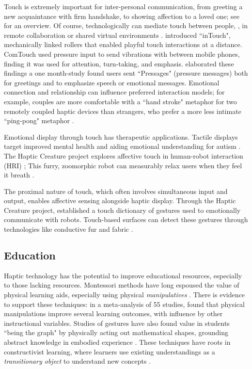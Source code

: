 Touch is extremely important for inter-personal communication, from greeting a new acquaintance with firm handshake, to showing affection to a loved one; see \citet{Gallace2010} for an overview.
Of course, technologically can mediate touch between people, \eg, in remote collaboration or shared virtual environments \cite{Haans2006}.
\citet{Brave1997} introduced ``inTouch", mechanically linked rollers that enabled playful touch interactions at a distance.
ComTouch \cite{Chang2002a} used pressure input to send vibrations with between mobile phones, finding it was used for attention, turn-taking, and emphasis.
\citet{Hoggan2012} elaborated these findings a one month-study found users sent ``Pressages" (pressure messages) both for greetings and to emphasize speech or emotional messages.
Emotional connection and relationship can influence preferred interaction models; for example, couples are more comfortable with a ``hand stroke" metaphor for two remotely coupled haptic devices than strangers, who prefer a more less intimate ``ping-pong" metaphor \cite{Smith2007}.

Emotional display through touch has therapeutic applications.
Tactile displays target improved mental health \cite{Vaucelle2009} and aiding emotional understanding for autism \cite{Changeon2012}.
The Haptic Creature project explores affective touch in human-robot interaction (HRI) \cite{Yohanan2005,Yohanan2009,Yohanan2011,Yohanan2011};
This furry, zoomorphic robot can measurably relax users when they feel it breath \cite{Sefidgar2016}.


The proximal nature of touch, which often involves simultaneous input and output, enables affective sensing alongside haptic display.
Through the Haptic Creature project, \citet{Yohanan2011} established a touch dictionary of gestures used to emotionally communicate with robots.
Touch-based surfaces can detect these gestures \cite{Flagg2013} through technologies like conductive fur and fabric \cite{Flagg2012}.


\subsection{Education}
Haptic technology has the potential to improve educational resources, especially to those lacking resources.
Montessori methods have long espoused the value of physical learning aids, especially using physical \emph{manipulatives} \cite{Montessori1917}.
There is evidence to support these techniques: in a meta-analysis of 55 studies, \citet{Carbonneau2013} found that physical manipulations improve several learning outcomes, with influence by other instructional variables.
Studies of gestures have also found value in students ``being the graph" by physically acting out mathematical shapes, grounding abstract knowledge in embodied experience \cite{Gerofsky2010}.
These techniques have roots in constructivist learning, where learners use existing understandings as a \emph{transitionary object} to understand new concepts \cite{Papert1980}.

